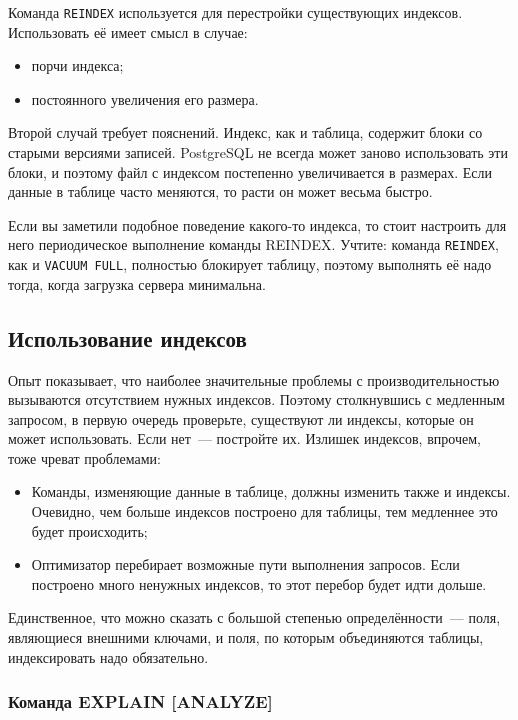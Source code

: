Команда \lstinline!REINDEX! используется для перестройки существующих индексов. Использовать её имеет смысл в случае:

\begin{itemize}
  \item порчи индекса;
  \item постоянного увеличения его размера.
\end{itemize}

Второй случай требует пояснений. Индекс, как и таблица, содержит блоки со старыми версиями записей. PostgreSQL не всегда может заново использовать эти блоки, и поэтому файл с индексом постепенно увеличивается в размерах. Если данные в таблице часто меняются, то расти он может весьма быстро.

Если вы заметили подобное поведение какого-то индекса, то стоит настроить для него периодическое выполнение команды REINDEX. Учтите: команда \lstinline!REINDEX!, как и \lstinline!VACUUM FULL!, полностью блокирует таблицу, поэтому выполнять её надо тогда, когда загрузка сервера минимальна.


\subsection{Использование индексов}

Опыт показывает, что наиболее значительные проблемы с производительностью вызываются отсутствием нужных индексов. Поэтому столкнувшись с медленным запросом, в первую очередь проверьте, существуют ли индексы, которые он может использовать. Если нет~--- постройте их. Излишек индексов, впрочем, тоже чреват проблемами:

\begin{itemize}
  \item Команды, изменяющие данные в таблице, должны изменить также и индексы. Очевидно, чем больше индексов построено для таблицы, тем медленнее это будет происходить;
  \item Оптимизатор перебирает возможные пути выполнения запросов. Если построено много ненужных индексов, то этот перебор будет идти дольше.
\end{itemize}

Единственное, что можно сказать с большой степенью определённости~--- поля, являющиеся внешними ключами, и поля, по которым объединяются таблицы, индексировать надо обязательно.


\subsubsection{Команда EXPLAIN [ANALYZE]}

